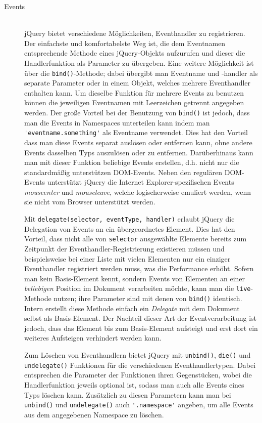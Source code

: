 \begin{description}
\item[Events] \hfill \\
jQuery bietet verschiedene Möglichkeiten, Eventhandler zu registrieren. Der einfachste und
komfortabelste Weg ist, die dem Eventnamen entsprechende Methode eines jQuery-Objekts aufzurufen und
dieser die Handlerfunktion als Parameter zu übergeben. Eine weitere Möglichkeit ist über die
\lstinline{bind()}-Methode; dabei übergibt man Eventname und -handler als separate Parameter oder in
einem Objekt, welches mehrere Eventhandler enthalten kann. Um dieselbe Funktion für mehrere Events
zu benutzen können die jeweiligen Eventnamen mit Leerzeichen getrennt angegeben werden. Der große
Vorteil bei der Benutzung von \lstinline{bind()} ist jedoch, dass man die Events in Namespaces
unterteilen kann indem man \lstinline{'eventname.something'} als Eventname verwendet. Dies hat den
Vorteil dass man diese Events separat auslösen oder entfernen kann, ohne andere Events dasselben
Typs auszulösen oder zu entfernen. Darüberhinaus kann man mit dieser Funktion beliebige Events
erstellen, d.h. nicht nur die standardmäßig unterstützen DOM-Events. Neben den regulären DOM-Events
unterstützt jQuery die Internet Explorer-spezifischen Events \emph{mouseenter} und
\emph{mouseleave}, welche logischerweise emuliert werden, wenn sie nicht vom Browser unterstützt
werden.

Mit \lstinline{delegate(selector, eventType, handler)} erlaubt jQuery die Delegation von Events an
ein übergeordnetes Element. Dies hat den Vorteil, dass nicht alle von \lstinline{selector}
ausgewählte Elemente bereits zum Zeitpunkt der Eventhandler-Registrierung existieren müssen und
beispielsweise bei einer Liste mit vielen Elementen nur ein einziger Eventhandler registriert werden
muss, was die Performance erhöht. Sofern man kein Basis-Element kennt, sondern Events von Elementen
an einer \emph{beliebigen} Position im Dokument verarbeiten möchte, kann man die
\lstinline{live}-Methode nutzen; ihre Parameter sind mit denen von \lstinline{bind()} identisch.
Intern erstellt diese Methode einfach ein \emph{Delegate} mit dem Dokument selbst als Basis-Element.
Der Nachteil dieser Art der Eventverarbeitung ist jedoch, dass das Element bis zum Basis-Element
aufsteigt und erst dort ein weiteres Aufsteigen verhindert werden kann.

Zum Löschen von Eventhandlern bietet jQuery mit \lstinline{unbind()}, \lstinline{die()} und
\lstinline{undelegate()} Funktionen für die verschiedenen Eventhandlertypen. Dabei entsprechen die
Parameter der Funktionen ihren Gegenstücken, wobei die Handlerfunktion jeweils optional ist, sodass
man auch alle Events eines Typs löschen kann. Zusätzlich zu diesen Parametern kann man bei
\lstinline{unbind()} und \lstinline{undelegate()} auch \lstinline{'.namespace'} angeben, um alle
Events aus dem angegebenen Namespace zu löschen.


\end{description}
